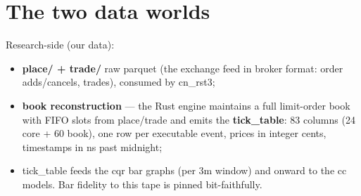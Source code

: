 \documentclass[11pt,a4paper]{article}
\begin{document}
\vspace{1em}

\begin{abstract}
We are connecting the obgx research stack (place/trade $\rightarrow$ book
reconstruction $\rightarrow$ \texttt{tick\_table} $\rightarrow$ cqr bar
graphs $\rightarrow$ cc models) to a live Chinese-equity feed --- the TORA
(HuaXin Qidian) native L2 API, which delivers order-by-order order and trade
streams plus a 10-level book snapshot stream. The central question is the
alignment between \emph{our data} (the reconstructed research tick tape) and
\emph{their live data} (the vendor L2 streams). We extracted the exact
row-generation contract from the Rust engine (cn\_rst3), re-dressed the
research tape as a TORA-shaped capture, and measured the live pipeline's
fidelity on real 20220104 data: \textbf{98.4\% cell-exact} across the
statelessly-representable rows (21{,}719 rows), with event codes, signs and
volumes each \textbf{99.9\%} exact. The residual deltas are precisely
attributed, and the strategy to close them --- reconstruct the book from the
vendor's own order-by-order updates and use the vendor's level snapshots only
as a \emph{reference} for the reconstruction --- is specified here together
with the remaining per-order row-mutation port.
\end{abstract}

\section{The two data worlds}

Research-side (our data):
\begin{itemize}
  \item \textbf{place/ + trade/} raw parquet (the exchange feed in broker
        format: order adds/cancels, trades), consumed by cn\_rst3;
  \item \textbf{book reconstruction} --- the Rust engine maintains a full
        limit-order book with FIFO slots from place/trade and emits the
        \textbf{tick\_table}: 83 columns (24 core + 60 book), one row per
        executable event, prices in integer cents, timestamps in ns past
        midnight;
  \item tick\_table feeds the cqr bar graphs (per 3m window) and onward to
        the cc models. Bar fidelity to this tape is pinned bit-faithfully.
\end{itemize}
\end{document}
